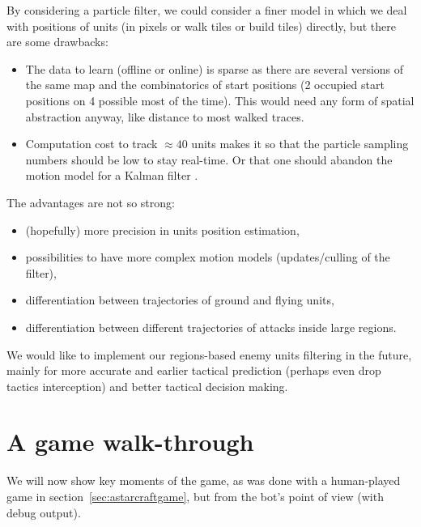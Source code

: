 By considering a particle filter, we could consider a finer model in which we deal with positions of units (in pixels or walk tiles or build tiles) directly, but there are some drawbacks:
\begin{itemize}
    \item The data to learn (offline or online) is sparse as there are several versions of the same map and the combinatorics of start positions (2 occupied start positions on 4 possible most of the time). This would need any form of spatial abstraction anyway, like distance to most walked traces.
    \item Computation cost to track $\approx 40$ units makes it so that the particle sampling numbers should be low to stay real-time. Or that one should abandon the motion model for a Kalman filter \citep{Kalman1960}. 
\end{itemize}
The advantages are not so strong: 
\begin{itemize}
    \item (hopefully) more precision in units position estimation,
    \item possibilities to have more complex motion models (updates/culling of the filter),
    \item differentiation between trajectories of ground and flying units,
    \item differentiation between different trajectories of attacks inside large regions.
\end{itemize}
We would like to implement our regions-based enemy units filtering in the future, mainly for more accurate and earlier tactical prediction (perhaps even drop tactics interception) and better tactical decision making.


\section{A game walk-through}

We will now show key moments of the game, as was done with a human-played game in section~\ref{sec:astarcraftgame}, but from the bot's point of view (with debug output).

